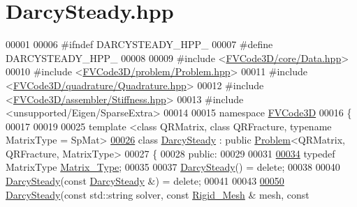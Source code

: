 \hypertarget{DarcySteady_8hpp_source}{}\section{Darcy\+Steady.\+hpp}
\label{DarcySteady_8hpp_source}

\begin{DoxyCode}
00001 
00006 \textcolor{preprocessor}{#ifndef DARCYSTEADY\_HPP\_}
00007 \textcolor{preprocessor}{#define DARCYSTEADY\_HPP\_}
00008 
00009 \textcolor{preprocessor}{#include <\hyperlink{Data_8hpp}{FVCode3D/core/Data.hpp}>}
00010 \textcolor{preprocessor}{#include <\hyperlink{Problem_8hpp}{FVCode3D/problem/Problem.hpp}>}
00011 \textcolor{preprocessor}{#include <\hyperlink{Quadrature_8hpp}{FVCode3D/quadrature/Quadrature.hpp}>}
00012 \textcolor{preprocessor}{#include <\hyperlink{Stiffness_8hpp}{FVCode3D/assembler/Stiffness.hpp}>}
00013 \textcolor{preprocessor}{#include <unsupported/Eigen/SparseExtra>}
00014 
00015 \textcolor{keyword}{namespace }\hyperlink{namespaceFVCode3D}{FVCode3D}
00016 \{
00017 
00019 
00025 \textcolor{keyword}{template} <\textcolor{keyword}{class} QRMatrix, \textcolor{keyword}{class} QRFracture, \textcolor{keyword}{typename} MatrixType = SpMat>
\hypertarget{DarcySteady_8hpp_source.tex_l00026}{}\hyperlink{classFVCode3D_1_1DarcySteady}{00026} \textcolor{keyword}{class }\hyperlink{classFVCode3D_1_1DarcySteady}{DarcySteady} : \textcolor{keyword}{public} \hyperlink{classFVCode3D_1_1Problem}{Problem}<QRMatrix, QRFracture, MatrixType>
00027 \{
00028 \textcolor{keyword}{public}:
00029 
00031 
\hypertarget{DarcySteady_8hpp_source.tex_l00034}{}\hyperlink{classFVCode3D_1_1DarcySteady_aa06573b2c5767486a09fb33c4b0cb480}{00034}     \textcolor{keyword}{typedef} MatrixType \hyperlink{classFVCode3D_1_1DarcySteady_aa06573b2c5767486a09fb33c4b0cb480}{Matrix\_Type};
00035 
00037     \hyperlink{classFVCode3D_1_1DarcySteady_ac483d4725a121bc6c6b48d159358d7bc}{DarcySteady}() = \textcolor{keyword}{delete};
00038 
00040     \hyperlink{classFVCode3D_1_1DarcySteady_ac483d4725a121bc6c6b48d159358d7bc}{DarcySteady}(\textcolor{keyword}{const} \hyperlink{classFVCode3D_1_1DarcySteady}{DarcySteady} &) = \textcolor{keyword}{delete};
00041 
00043 
\hypertarget{DarcySteady_8hpp_source.tex_l00050}{}\hyperlink{classFVCode3D_1_1DarcySteady_ad62eb3f00ffd84247f1efabc4bc44c54}{00050}     \hyperlink{classFVCode3D_1_1DarcySteady_ad62eb3f00ffd84247f1efabc4bc44c54}{DarcySteady}(\textcolor{keyword}{const} std::string solver, \textcolor{keyword}{const} \hyperlink{classFVCode3D_1_1Rigid__Mesh}{Rigid\_Mesh} & mesh, \textcolor{keyword}{const} 

\end{DoxyCode}
